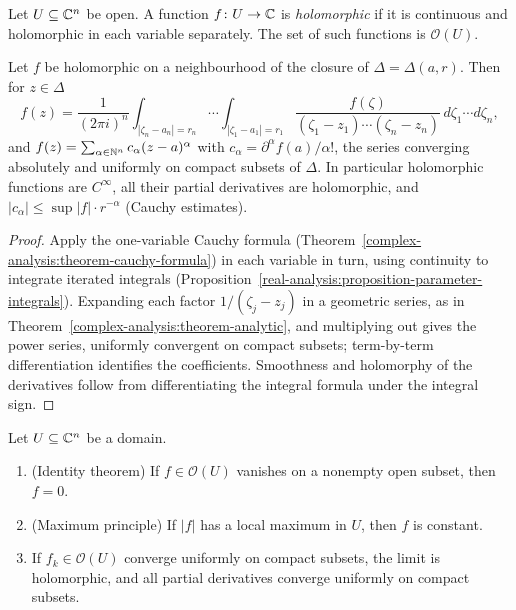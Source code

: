\begin{definition}\label{several-complex-variables:definition-holomorphic}
Let $U \subseteq \mathbb{C}^n$ be open. A function $f \colon U \to \mathbb{C}$ is \emph{holomorphic} if it is continuous and holomorphic in each variable separately. The set of such functions is
$\mathcal{O}(U)$.
\end{definition}

\begin{theorem}\label{several-complex-variables:theorem-cauchy-polydisc}
Let $f$ be holomorphic on a neighbourhood of the closure of $\Delta = \Delta(a, r)$. Then for $z \in \Delta$
\[
f(z) = \frac{1}{(2\pi i)^n}\int_{|\zeta_n - a_n| = r_n}\cdots\int_{|\zeta_1 - a_1| = r_1}\frac{f(\zeta)}{(\zeta_1 - z_1)\cdots(\zeta_n - z_n)}\,d\zeta_1\cdots d\zeta_n,
\]
and $f(z) = \sum_{\alpha \in \mathbb{N}^n}c_\alpha(z - a)^\alpha$ with $c_\alpha = \partial^\alpha f(a)/\alpha!$, the series converging absolutely and uniformly on compact subsets of $\Delta$. In particular
holomorphic functions are $C^\infty$, all their partial derivatives are holomorphic, and $|c_\alpha| \leq \sup|f| \cdot r^{-\alpha}$ (Cauchy estimates).
\end{theorem}

\begin{proof}
Apply the one-variable Cauchy formula (Theorem~\ref{complex-analysis:theorem-cauchy-formula}) in each variable in turn, using continuity to integrate iterated integrals
(Proposition~\ref{real-analysis:proposition-parameter-integrals}). Expanding each factor $1/(\zeta_j - z_j)$ in a geometric series, as in Theorem~\ref{complex-analysis:theorem-analytic}, and
multiplying out gives the power series, uniformly convergent on compact subsets; term-by-term differentiation identifies the coefficients. Smoothness and holomorphy of the derivatives follow from
differentiating the integral formula under the integral sign.
\end{proof}

\begin{proposition}\label{several-complex-variables:proposition-identity-maximum}
Let $U \subseteq \mathbb{C}^n$ be a domain.
\begin{enumerate}
\item (Identity theorem) If $f \in \mathcal{O}(U)$ vanishes on a nonempty open subset, then $f = 0$.
\item (Maximum principle) If $|f|$ has a local maximum in $U$, then $f$ is constant.
\item If $f_k \in \mathcal{O}(U)$ converge uniformly on compact subsets, the limit is holomorphic, and all partial derivatives converge uniformly on compact subsets.
\end{enumerate}
\end{proposition}

